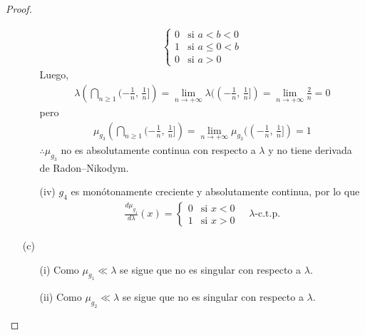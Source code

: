 \documentclass[12pt]{article}
\begin{document}
\begin{proof}
\begin{itemize}
\begin{itemize}
\begin{align*}
\begin{cases}
                                                                             0 & \text{si } a < b < 0    \\
                                                                             1 & \text{si } a \leq 0 < b \\
                                                                             0 & \text{si } a > 0
                                                                         \end{cases}
                        \end{align*} Luego, \begin{align*}
                            \lambda\left( \bigcap_{n \geq 1} (-\frac{1}{n}\text{, }\frac{1}{n}] \right) = \lim_{n \to +\infty} \lambda((  -\frac{1}{n}\text{, }\frac{1}{n}]) = \lim_{n \to +\infty} \frac{2}{n} = 0
                        \end{align*} pero \begin{align*}
                            \mu_{g_3}\left( \bigcap_{n \geq 1} (-\frac{1}{n}\text{, }\frac{1}{n}] \right) = \lim_{n \to +\infty} \mu_{g_3}((-\frac{1}{n}\text{, }\frac{1}{n}]) = 1
                        \end{align*} \(\therefore \mu_{g_3} \) no es absolutamente continua con respecto a \(\lambda \) y no tiene derivada de Radon–Nikodym.
                  \item[(iv)] \(g_4 \) es monótonamente creciente y absolutamente continua, por lo que \begin{align*}
                            \frac{d\mu_{g_4}}{d\lambda}(x) = \begin{cases}
                                                                 0 & \text{si } x < 0 \\
                                                                 1 & \text{si } x > 0
                                                             \end{cases} \quad \lambda\text{-c.t.p.}
                        \end{align*}
              \end{itemize}
        \item[(c)] \begin{itemize}
                  \item[(i)] Como \(\mu_{g_1} \ll \lambda \) se sigue que no es singular con respecto a \(\lambda \).
                  \item[(ii)] Como \(\mu_{g_2} \ll \lambda \) se sigue que no es singular con respecto a \(\lambda \).

\end{itemize}
\end{itemize}
\end{proof}
\end{document}
